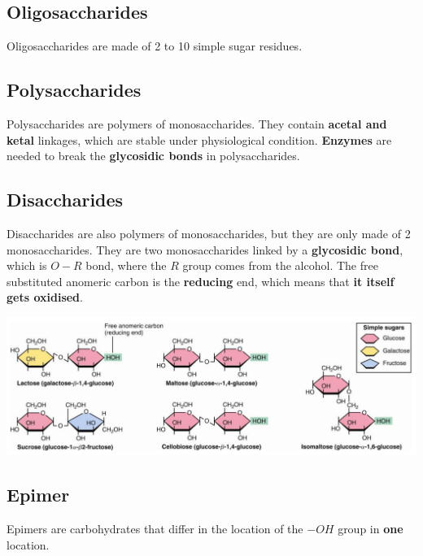 \documentclass[11pt]{article}
\begin{document}
\subsection{Oligosaccharides}
\label{sec:orgc8955d0}
Oligosaccharides are made of 2 to 10 simple sugar residues.

\subsection{Polysaccharides}
\label{sec:org2ba8878}
Polysaccharides are polymers of monosaccharides. They contain \textbf{acetal and ketal} linkages, which are stable under physiological condition. \textbf{Enzymes} are needed to break the \textbf{glycosidic bonds} in polysaccharides.

\subsection{Disaccharides}
\label{sec:org3e83d08}
Disaccharides are also polymers of monosaccharides, but they are only made of 2 monosaccharides. They are two monosaccharides linked by a \textbf{glycosidic bond}, which is \(O-R\) bond, where the \(R\) group comes from the alcohol. The free substituted anomeric carbon is the \textbf{reducing} end, which means that \textbf{it itself gets oxidised}.
\begin{center}
\includegraphics[width=.9\linewidth]{./images/disaccharides.png}
\end{center}

\subsection{Epimer}
\label{sec:orgf1a86dd}
Epimers are carbohydrates that differ in the location of the \(-OH\) group in \textbf{one} location.
\end{document}
